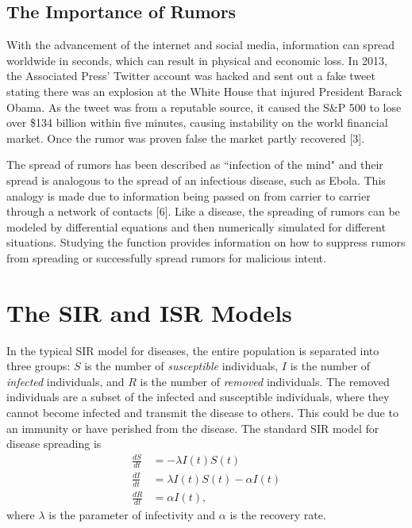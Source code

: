 \documentclass[11pt]{article}
\begin{document}
\subsection{The Importance of Rumors}
With the advancement of the internet and social media, information can spread worldwide in seconds, which can result in physical and economic loss. In 2013, the Associated Press' Twitter account was hacked and sent out a fake tweet stating there was an explosion at the White House that injured President Barack Obama. As the tweet was from a reputable source, it caused the S\&P 500 to lose over \$134 billion within five minutes, causing instability on the world financial market. Once the rumor was proven false the market partly recovered [3].

The spread of rumors has been described as ``infection of the mind" and their spread is analogous to the spread of an infectious disease, such as Ebola. This analogy is made due to information being passed on from carrier to carrier through a network of contacts [6]. Like a disease, the spreading of rumors can be modeled by differential equations and then numerically simulated for different situations. Studying the function provides information on how to suppress rumors from spreading or successfully spread rumors for malicious intent.   






\section{The SIR and ISR Models}   
In the typical SIR model for diseases, the entire population is separated into three groups: $S$ is the number of \textit{susceptible} individuals, $I$ is the number of \textit{infected} individuals, and $R$ is the number of \textit{removed} individuals. The removed individuals are a subset of the infected and susceptible individuals, where they cannot become infected and transmit the disease to others. This could be due to an immunity or have perished from the disease. The standard SIR model for disease spreading is
	\begin{align*}
    \frac{dS}{dt} &= -\lambda I(t)S(t) \\
    \frac{dI}{dt} &=  \lambda I(t)S(t) - \alpha I(t) \\
    \frac{dR}{dt} &=  \alpha I(t),
    \end{align*}
where $\lambda$ is the parameter of infectivity and $\alpha$ is the recovery rate.
\end{document}
